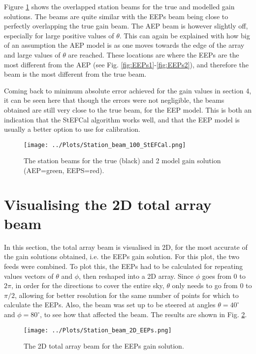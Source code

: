 \documentclass[12pt]{report} %
\begin{document}
Figure \ref{fig:station_beam_AEP} shows the overlapped station beams for the true and modelled gain solutions. The beams are quite similar with the EEPs beam being close to perfectly overlapping the true gain beam. The AEP beam is however slightly off, especially for large positive values of $\theta$. This can again be explained with how big of an assumption the AEP model is as one moves towards the edge of the array and large values of $\theta$ are reached. These locations are where the EEPs are the most different from the AEP (see Fig. \ref{fig:EEPs1}-\ref{fig:EEPs2}), and therefore the beam is the most different from the true beam.

Coming back to minimum absolute error achieved for the gain values in section 4, it can be seen here that though the errors were not negligible, the beams obtained are still very close to the true beam, for the EEP model. This is both an indication that the StEFCal algorithm works well, and that the EEP model is usually a better option to use for calibration.


\begin{figure}[htbp]
  \centering
  \texttt{[image: ../Plots/Station\_beam\_100\_StEFCal.png]}
  \caption{The station beams for the true (black) and 2 model gain solution (AEP=green, EEPS=red). }
  \label{fig:station_beam_AEP}
\end{figure}



\section{Visualising the 2D total array beam}

In this section, the total array beam is visualised in 2D, for the most accurate of the gain solutions obtained, i.e. the EEPs gain solution. For this plot, the two feeds were combined. To plot this, the EEPs had to be calculated for repeating values vectors of $\theta$ and $\phi$, then reshaped into a 2D array. Since $\phi$ goes from $0$ to $2\pi$, in order for the directions to cover the entire sky, $\theta$ only needs to go from $0$ to $\pi/2$, allowing for better resolution for the same number of points for which to calculate the EEPs. Also, the beam was set up to be steered at angles $\theta = 40^{\circ}$ and $\phi = 80^{\circ}$, to see how that affected the beam. The results are shown in Fig. \ref{fig:2D_beam_EEP}.
\begin{figure}[h]
    \centering
    \texttt{[image: ../Plots/Station\_beam\_2D\_EEPs.png]}
    \caption{The 2D total array beam for the EEPs gain solution.}
    \label{fig:2D_beam_EEP}
\end{figure}
\end{document}
